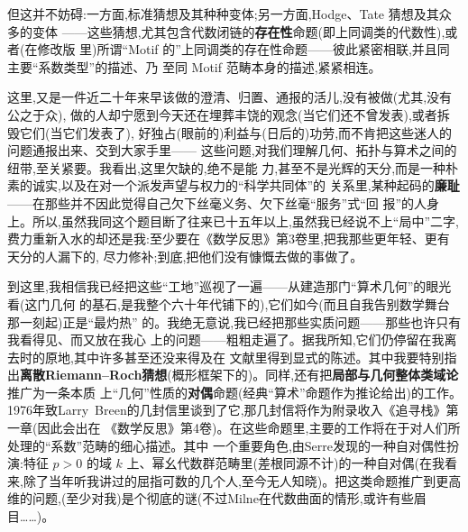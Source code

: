 \pmark{}但这并不妨碍:一方面,标准猜想及其种种变体;另一方面,Hodge、Tate 猜想及其众多的变体
——这些猜想,尤其包含代数闭链的\textbf{存在性}命题(即上同调类的代数性),或者(在修改版
里)所谓“Motif 的”上同调类的存在性命题——彼此紧密相联,并且同主要“系数类型”的描述、乃
至同 Motif 范畴本身的描述,紧紧相连。

这里,又是一件近二十年来早该做的澄清、归置、通报的活儿,没有被做(尤其,没有公之于众),
做的人却宁愿到今天还在埋葬丰饶的观念(当它们还不曾发表),或者拆毁它们(当它们发表了),
好独占(眼前的)利益与(日后的)功劳,而不肯把这些迷人的问题通报出来、交到大家手里——
这些问题,对我们理解几何、拓扑与算术之间的纽带,至关紧要。我看出,这里欠缺的,绝不是能
力,甚至不是光辉的天分,而是一种朴素的诚实,以及在对一个派发声望与权力的“科学共同体”的
关系里,某种起码的\textbf{廉耻}——在那些并不因此觉得自己欠下丝毫义务、欠下丝毫“服务”式“回
报”的人身上。所以,虽然我同这个题目断了往来已十五年以上,虽然我已经说不上“局中”二字,
费力重新入水的却还是我:至少要在《数学反思》第3卷里,把我那些更年轻、更有天分的人漏下的,
尽力修补;到底,把他们没有慷慨去做的事做了。

到这里,我相信我已经把这些“工地”巡视了一遍——从建造那门“算术几何”的眼光看(这门几何
的基石,是我整个六十年代铺下的),它们如今(而且自我告别数学舞台那一刻起)正是“\dmark{}最灼热”
的。我绝无意说,我已经把那些实质问题——那些也许只有我看得见、而又放在我心
上的问题——粗粗走遍了。据我所知,它们仍停留在我离去时的原地,其中许多甚至还没来得及在
文献里得到显式的陈述。其中我要特别指出\textbf{离散Riemann--Roch猜想}(概形框架下的)。同样,还有把\textbf{局部与几何整体类域论}推广为一条本质
上“几何”性质的\textbf{对偶}命题(经典“算术”命题作为推论给出)的工作。1976年致Larry~Breen的几封信里谈到了它,那几封信将作为附录收入《追寻栈》第一章(因此会出在
《数学反思》第4卷)。在这些命题里,主要的工作将在于对人们所处理的“系数”范畴的细心描述。其中
一个重要角色,由Serre发现的一种自对偶性扮演:特征 $p>0$ 的域 $k$ 上、幂幺代数群范畴里(差根同源不计)的一种自对偶(在我看来,除了当年听我讲过的屈指可数的几个人,至今无人知晓)。把这类命题推广到更高维的问题,(至少对我)是个彻底的谜(不过Milne在代数曲面的情形,或许有些眉目……)。

